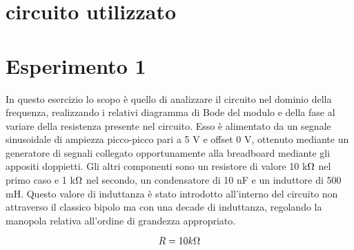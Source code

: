 \section{circuito utilizzato}
\begin{figure}[!ht]
\centering %
%

\label{fig:my_label}
\end{figure}

\section{Esperimento 1}

In questo esercizio lo scopo è quello di analizzare il circuito nel dominio della frequenza, realizzando i relativi
diagramma di Bode del modulo e della fase al variare della resistenza presente nel circuito. Esso è alimentato
da un segnale sinusoidale di ampiezza picco-picco pari a 5 V e offset 0 V, ottenuto mediante un generatore di
segnali collegato opportunamente alla breadboard mediante gli appositi doppietti. Gli altri componenti sono
un resistore di valore 10 k$\ohm$ nel primo caso e 1 k$\ohm$ nel secondo, un condensatore di 10 nF e un induttore di
500 mH. Questo valore di induttanza è stato introdotto all’interno del circuito non attraverso il classico bipolo
ma con una decade di induttanza, regolando la manopola relativa all’ordine di grandezza appropriato.

$$\huge R= 10k\ohm$$

